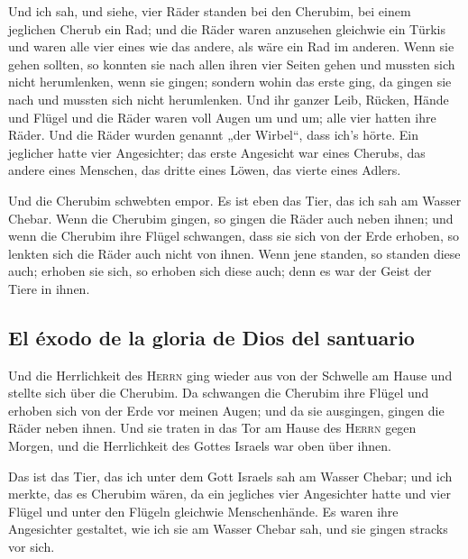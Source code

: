 Und ich sah, und siehe, vier Räder standen bei den
Cherubim, bei einem jeglichen Cherub ein Rad; und die Räder waren
anzusehen gleichwie ein Türkis  und waren alle vier eines
wie das andere, als wäre ein Rad im anderen.  Wenn sie
gehen sollten, so konnten sie nach allen ihren vier Seiten gehen und
mussten sich nicht herumlenken, wenn sie gingen; sondern wohin das erste
ging, da gingen sie nach und mussten sich nicht herumlenken.
 Und ihr ganzer Leib, Rücken, Hände und Flügel und die
Räder waren voll Augen um und um; alle vier hatten ihre Räder.
 Und die Räder wurden genannt „der Wirbel``, dass ich's
hörte.  Ein jeglicher hatte vier Angesichter; das erste
Angesicht war eines Cherubs, das andere eines Menschen, das dritte eines
Löwen, das vierte eines Adlers.

 Und die Cherubim schwebten empor. Es ist eben das Tier,
das ich sah am Wasser Chebar.  Wenn die Cherubim gingen,
so gingen die Räder auch neben ihnen; und wenn die Cherubim ihre Flügel
schwangen, dass sie sich von der Erde erhoben, so lenkten sich die Räder
auch nicht von ihnen.  Wenn jene standen, so standen
diese auch; erhoben sie sich, so erhoben sich diese auch; denn es war
der Geist der Tiere in ihnen.

\hypertarget{el-uxe9xodo-de-la-gloria-de-dios-del-santuario}{%
\subsection{El éxodo de la gloria de Dios del
santuario}\label{el-uxe9xodo-de-la-gloria-de-dios-del-santuario}}

 Und die Herrlichkeit des \textsc{Herrn} ging wieder aus
von der Schwelle am Hause und stellte sich über die Cherubim.
 Da schwangen die Cherubim ihre Flügel und erhoben sich
von der Erde vor meinen Augen; und da sie ausgingen, gingen die Räder
neben ihnen. Und sie traten in das Tor am Hause des \textsc{Herrn} gegen
Morgen, und die Herrlichkeit des Gottes Israels war oben über ihnen.

 Das ist das Tier, das ich unter dem Gott Israels sah am
Wasser Chebar; und ich merkte, das es Cherubim wären,  da
ein jegliches vier Angesichter hatte und vier Flügel und unter den
Flügeln gleichwie Menschenhände.  Es waren ihre
Angesichter gestaltet, wie ich sie am Wasser Chebar sah, und sie gingen
stracks vor sich.

